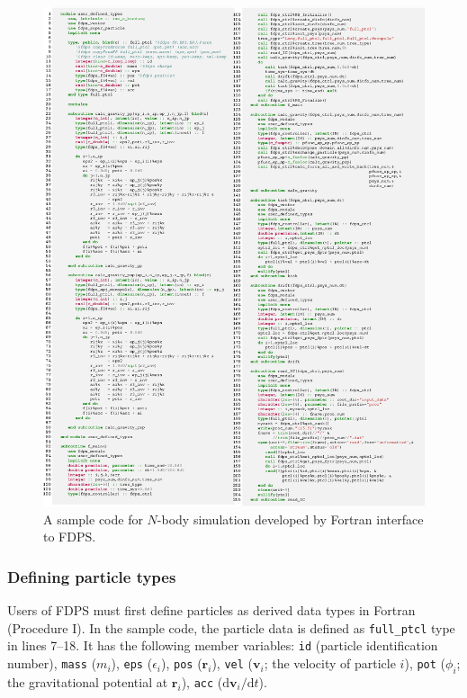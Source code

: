 \documentclass[twocolumn,useamsfonts]{pasj01}
\newcommand{\diff}{{\mathrm d}}
\begin{document}
\begin{figure}[htbp]
\centering
\includegraphics[width=0.95\hsize]{./figures/src_ftn_smpl}
\caption{A sample code for $N$-body simulation developed by Fortran interface to FDPS.}
\label{fig:src_ftn_smpl}  
\end{figure}


\subsubsection{Defining particle types}
\label{subsubsec:def_ptcl_type}
Users of FDPS must first define particles as derived data types in Fortran (Procedure I). In the sample code, the particle data is defined as \texttt{full\_ptcl} type in lines 7--18. It has the following member variables: \texttt{id} (particle identification number), \texttt{mass} ($m_{i}$), \texttt{eps} ($\epsilon_{i}$), \texttt{pos} ($\bm{r}_{i}$), \texttt{vel} ($\bm{v}_{i}$; the velocity of particle $i$), \texttt{pot} ($\phi_{i}$; the gravitational potential at $\bm{r}_{i}$), \texttt{acc} ($\diff \bm{v}_{i}/\diff t$).
\end{document}
